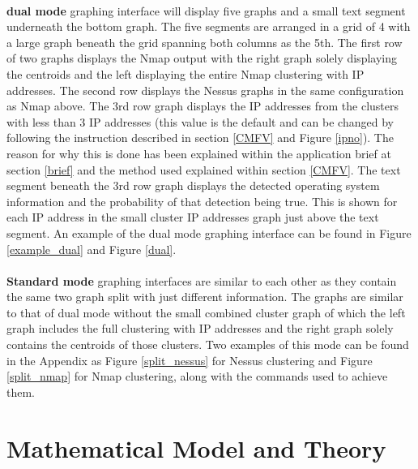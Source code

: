 \paragraph{}\textbf{dual mode} graphing interface will display five graphs and a small text segment underneath the bottom graph. The five segments are arranged in a grid of 4 with a large graph beneath the grid spanning both columns as the 5th. The first row of two graphs displays the Nmap output with the right graph solely displaying the centroids and the left displaying the entire Nmap clustering with IP addresses. The second row displays the Nessus graphs in the same configuration as Nmap above. The 3rd row graph displays the IP addresses from the clusters with less than 3 IP addresses (this value is the default and can be changed by following the instruction described in section \ref{CMFV} and Figure \ref{ipno}). The reason for why this is done has been explained within the application brief at section \ref{brief} and the method used explained within section \ref{CMFV}. The text segment beneath the 3rd row graph displays the detected operating system information and the probability of that detection being true. This is shown for each IP address in the small cluster IP addresses graph just above the text segment. An example of the dual mode graphing interface can be found in Figure \ref{example_dual} and Figure \ref{dual}.\linebreak
\paragraph{}\textbf{Standard mode} graphing interfaces are similar to each other as they contain the same two graph split with just different information. The graphs are similar to that of dual mode without the small combined cluster graph of which the left graph includes the full clustering with IP addresses and the right graph solely contains the centroids of those clusters. Two examples of this mode can be found in the Appendix as Figure \ref{split_nessus} for Nessus clustering and Figure \ref{split_nmap} for Nmap clustering, along with the commands used to achieve them. 



\section{Mathematical Model and Theory}
\label{models}

